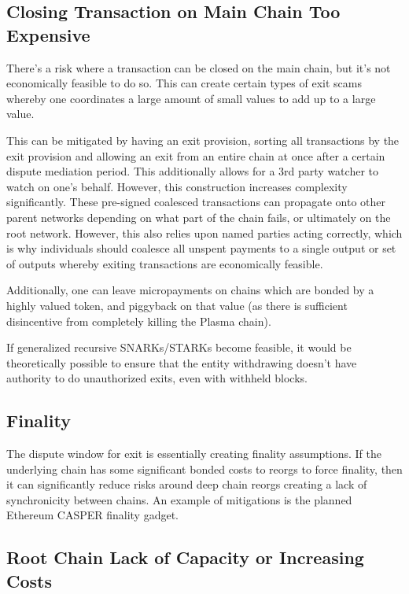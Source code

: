 \documentclass[letterpaper, 11pt]{article}
\begin{document}
\subsection{Closing Transaction on Main Chain Too Expensive}

There's a risk where a transaction can be closed on the main chain, but it's not
economically feasible to do so. This can create certain types of exit scams
whereby one coordinates a large amount of small values to add up to a large
value.

This can be mitigated by having an exit provision, sorting all transactions by
the exit provision and allowing an exit from an entire chain at once after a
certain dispute mediation period. This additionally allows for a 3rd party
watcher to watch on one's behalf. However, this construction increases
complexity significantly. These pre-signed coalesced transactions can propagate
onto other parent networks depending on what part of the chain fails, or
ultimately on the root network. However, this also relies upon named parties
acting correctly, which is why individuals should coalesce all unspent payments
to a single output or set of outputs whereby exiting transactions are
economically feasible.

Additionally, one can leave micropayments on chains which are bonded by a
highly valued token, and piggyback on that value (as there is sufficient
disincentive from completely killing the Plasma chain).

If generalized recursive SNARKs/STARKs become feasible, it would be
theoretically possible to ensure that the entity withdrawing doesn't have
authority to do unauthorized exits, even with withheld blocks.

\subsection{Finality}

The dispute window for exit is essentially creating finality assumptions. If the
underlying chain has some significant bonded costs to reorgs to force finality,
then it can significantly reduce risks around deep chain reorgs creating a lack
of synchronicity between chains. An example of mitigations is the planned
Ethereum CASPER finality gadget.

\subsection{Root Chain Lack of Capacity or Increasing Costs} 
\end{document}
